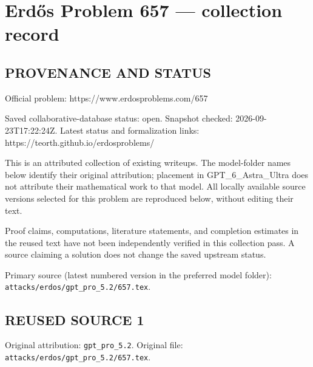 \section*{Erd\H{o}s Problem 657 --- collection record}

\subsection*{PROVENANCE AND STATUS}
Official problem: https://www.erdosproblems.com/657

Saved collaborative-database status: open.
Snapshot checked: 2026-09-23T17:22:24Z.
Latest status and formalization links: https://teorth.github.io/erdosproblems/

This is an attributed collection of existing writeups. The model-folder names below identify their original attribution; placement in GPT\_6\_Astra\_Ultra does not attribute their mathematical work to that model. All locally available source versions selected for this problem are reproduced below, without editing their text.

Proof claims, computations, literature statements, and completion estimates in the reused text have not been independently verified in this collection pass. A source claiming a solution does not change the saved upstream status.

Primary source (latest numbered version in the preferred model folder): \texttt{attacks/erdos/gpt\_pro\_5.2/657.tex}.

\subsection*{REUSED SOURCE 1}
Original attribution: \texttt{gpt\_pro\_5.2}.
Original file: \texttt{attacks/erdos/gpt\_pro\_5.2/657.tex}.


